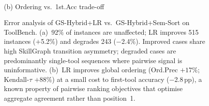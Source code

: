 \begin{figure}[!t]
\begin{minipage}[t]{0.52\columnwidth}
\vspace{2pt}\\
{\footnotesize (b) Ordering vs.\ 1st.Acc trade-off}
\end{minipage}
\caption{Error analysis of GS-Hybrid+LR vs.\ GS-Hybrid+Sem-Sort on ToolBench.
(a)~92\% of instances are unaffected; LR improves 515 instances ($+$5.2\%) and
degrades 243 ($-$2.4\%). Improved cases share high SkillGraph transition
asymmetry; degraded cases are predominantly single-tool sequences where
pairwise signal is uninformative.
(b)~LR improves global ordering (Ord.Prec $+17\%$; Kendall-$\tau$ $+88\%$) at
a small cost to first-tool accuracy ($-$2.8\,pp), a known property of pairwise
ranking objectives that optimise aggregate agreement rather than position~1.}
\label{fig:error_analysis}
\end{figure}
